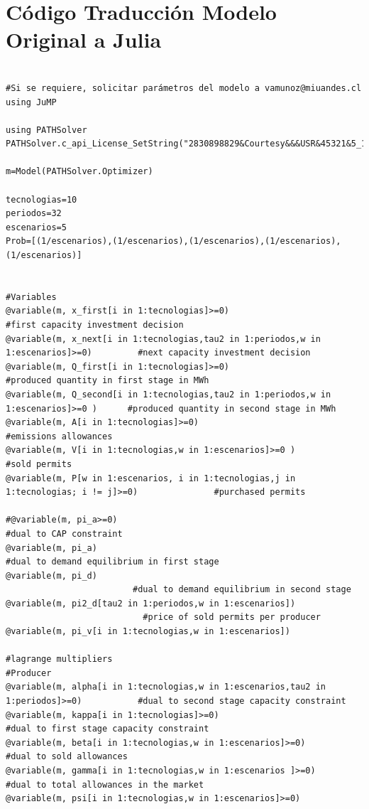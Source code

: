 \section{Código Traducción Modelo Original a Julia}\label{traduccionoriginal}
\begin{footnotesize}
\begin{lstlisting}

#Si se requiere, solicitar parámetros del modelo a vamunoz@miuandes.cl
using JuMP

using PATHSolver
PATHSolver.c_api_License_SetString("2830898829&Courtesy&&&USR&45321&5_1_2021&1000&PATH&GEN&31_12_2025&0_0_0&6000&0_0")

m=Model(PATHSolver.Optimizer)

tecnologias=10
periodos=32
escenarios=5
Prob=[(1/escenarios),(1/escenarios),(1/escenarios),(1/escenarios),(1/escenarios)]


#Variables
@variable(m, x_first[i in 1:tecnologias]>=0)                                   #first capacity investment decision
@variable(m, x_next[i in 1:tecnologias,tau2 in 1:periodos,w in 1:escenarios]>=0)         #next capacity investment decision
@variable(m, Q_first[i in 1:tecnologias]>=0)                                  #produced quantity in first stage in MWh
@variable(m, Q_second[i in 1:tecnologias,tau2 in 1:periodos,w in 1:escenarios]>=0 )      #produced quantity in second stage in MWh
@variable(m, A[i in 1:tecnologias]>=0)                                         #emissions allowances
@variable(m, V[i in 1:tecnologias,w in 1:escenarios]>=0 )                               #sold permits
@variable(m, P[w in 1:escenarios, i in 1:tecnologias,j in 1:tecnologias; i != j]>=0)               #purchased permits

#@variable(m, pi_a>=0)                                                      #dual to CAP constraint
@variable(m, pi_a)                                                #dual to demand equilibrium in first stage
@variable(m, pi_d) 
                         #dual to demand equilibrium in second stage
@variable(m, pi2_d[tau2 in 1:periodos,w in 1:escenarios])
                           #price of sold permits per producer
@variable(m, pi_v[i in 1:tecnologias,w in 1:escenarios])

#lagrange multipliers
#Producer
@variable(m, alpha[i in 1:tecnologias,w in 1:escenarios,tau2 in 1:periodos]>=0)           #dual to second stage capacity constraint
@variable(m, kappa[i in 1:tecnologias]>=0)                                   #dual to first stage capacity constraint
@variable(m, beta[i in 1:tecnologias,w in 1:escenarios]>=0)                                       #dual to sold allowances
@variable(m, gamma[i in 1:tecnologias,w in 1:escenarios ]>=0)                                    #dual to total allowances in the market
@variable(m, psi[i in 1:tecnologias,w in 1:escenarios]>=0)


\end{lstlisting}
\end{footnotesize}
